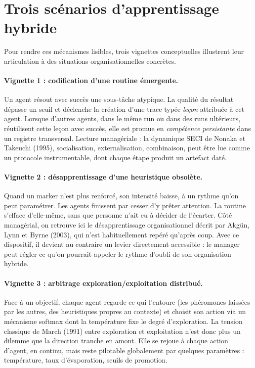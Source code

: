 \documentclass[12pt,a4paper]{article}
\begin{document}
\section{Trois scénarios d'apprentissage hybride}

Pour rendre ces mécanismes lisibles, trois vignettes conceptuelles illustrent leur articulation à des situations organisationnelles concrètes.

\paragraph{Vignette 1 : codification d'une routine émergente.} Un agent résout avec succès une sous-tâche atypique. La qualité du résultat dépasse un seuil et déclenche la création d'une trace typée \textit{leçon} attribuée à cet agent. Lorsque d'autres agents, dans le même run ou dans des runs ultérieurs, réutilisent cette leçon avec succès, elle est promue en \textit{compétence persistante} dans un registre transversal. Lecture managériale : la dynamique SECI de Nonaka et Takeuchi (1995), socialisation, externalisation, combinaison, peut être lue comme un protocole instrumentable, dont chaque étape produit un artefact daté.

\paragraph{Vignette 2 : désapprentissage d'une heuristique obsolète.} Quand un marker n'est plus renforcé, son intensité baisse, à un rythme qu'on peut paramétrer. Les agents finissent par cesser d'y prêter attention. La routine s'efface d'elle-même, sans que personne n'ait eu à décider de l'écarter. Côté managérial, on retrouve ici le désapprentissage organisationnel décrit par Akgün, Lynn et Byrne (2003), qui n'est habituellement repéré qu'après coup. Avec ce dispositif, il devient au contraire un levier directement accessible : le manager peut régler ce qu'on pourrait appeler le \og rythme d'oubli \fg{} de son organisation hybride.

\paragraph{Vignette 3 : arbitrage exploration/exploitation distribué.} Face à un objectif, chaque agent regarde ce qui l'entoure (les phéromones laissées par les autres, des heuristiques propres au contexte) et choisit son action via un mécanisme softmax dont la température fixe le degré d'exploration. La tension classique de March (1991) entre exploration et exploitation n'est donc plus un dilemme que la direction tranche en amont. Elle se rejoue à chaque action d'agent, en continu, mais reste pilotable globalement par quelques paramètres : température, taux d'évaporation, seuils de promotion.
\end{document}
